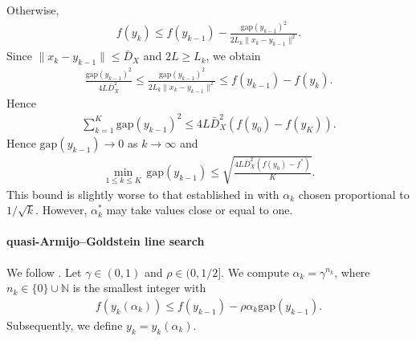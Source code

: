 \documentclass{scrartcl}
\begin{document}
	Otherwise, 
	\begin{align*}
		f(y_{k}) \leq f(y_{k-1}) 
		- \frac{\mathrm{gap}(y_{k-1})^2}{2L_k \|x_k -y_{k-1}\|^2}.
	\end{align*}
	Since $\|x_k -y_{k-1}\| \leq \bar{D}_{X}$ and $2L \geq L_k$, we obtain
	\begin{align*}
		\frac{\mathrm{gap}(y_{k-1})^2}{4L\bar{D}_{X}^2}
		\leq 
		\frac{\mathrm{gap}(y_{k-1})^2}{2L_k \|x_k -y_{k-1}\|^2}
		\leq f(y_{k-1})  - f(y_k).
	\end{align*}
	Hence
	\begin{align*}
		\sum_{k=1}^{K} \mathrm{gap}(y_{k-1})^2
		\leq 4 L \bar{D}_{X}^2(f(y_0)-f(y_K)).
	\end{align*}
	Hence $\mathrm{gap}(y_{k-1}) \to 0$ as $k \to \infty$ and
	\begin{align*}
		\min_{1\leq k \leq K}\, \mathrm{gap}(y_{k-1}) 
		\leq \sqrt{\frac{4 L \bar{D}_{X}^2(f(y_0)-f^*)}{K}}.
	\end{align*}
	This bound is slightly worse to that established in \cite[p.\ 469]{Lan2020}
	with $\alpha_k$ chosen proportional to $1/\sqrt{k}$.
	However, $\alpha_k^*$ may take values close or equal to one.
	
	\paragraph{quasi-Armijo--Goldstein line search}
	We follow \cite[Def.\ 3.2]{Kunisch2022}. Let $\gamma \in (0,1)$ and 
	$\rho \in (0,1/2]$. We compute $\alpha_k = \gamma^{n_k}$,
	where $n_k \in \{0\} \cup \mathbb{N}$ is the smallest integer with
	\begin{align*}
		f(y_k(\alpha_k)) \leq f(y_{k-1}) - \rho \alpha_k \mathrm{gap}(y_{k-1}).
	\end{align*} 
	Subsequently, we define $y_k = y_k(\alpha_k)$.
	
\end{document}
